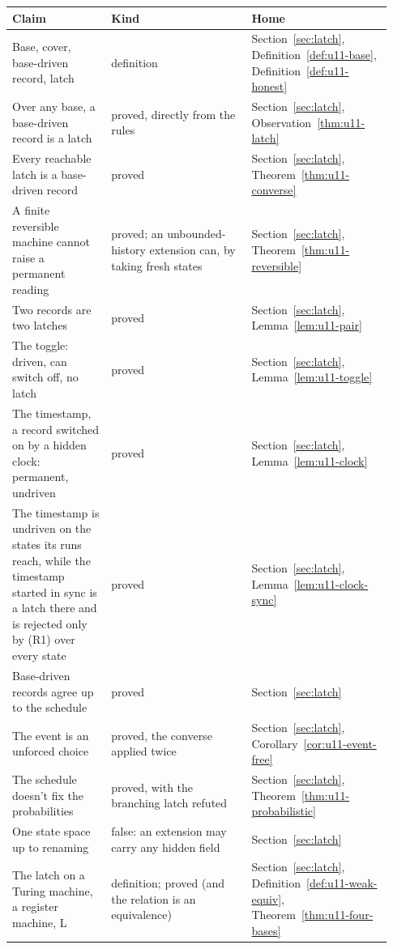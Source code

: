 \documentclass[11pt,twoside]{article}
\theoremstyle{thielethm}
\theoremstyle{thieledef}
\theoremstyle{thieledef}
\theoremstyle{thieledef}
\theoremstyle{thielethm}
\theoremstyle{thieleobs}
\theoremstyle{thielethm}
\begin{document}
\begingroup\small
\begin{longtable}{@{}>{\raggedright\arraybackslash}p{0.242\linewidth}>{\raggedright\arraybackslash}p{0.344\linewidth}>{\raggedright\arraybackslash}p{0.344\linewidth}@{}}
\toprule
\textbf{Claim} & \textbf{Kind} & \textbf{Home} \\
\midrule
\endhead
\bottomrule
\endlastfoot
Base, cover, base-driven record, latch & definition & Section~\ref{sec:latch}, Definition~\ref{def:u11-base}, Definition~\ref{def:u11-honest} \\
Over any base, a base-driven record is a latch & proved, directly from the rules & Section~\ref{sec:latch}, Observation~\ref{thm:u11-latch} \\
Every reachable latch is a base-driven record & proved & Section~\ref{sec:latch}, Theorem~\ref{thm:u11-converse} \\
A finite reversible machine cannot raise a permanent reading & proved; an unbounded-history extension can, by taking fresh states & Section~\ref{sec:latch}, Theorem~\ref{thm:u11-reversible} \\
Two records are two latches & proved & Section~\ref{sec:latch}, Lemma~\ref{lem:u11-pair} \\
The toggle: driven, can switch off, no latch & proved & Section~\ref{sec:latch}, Lemma~\ref{lem:u11-toggle} \\
The timestamp, a record switched on by a hidden clock: permanent, undriven & proved & Section~\ref{sec:latch}, Lemma~\ref{lem:u11-clock} \\
The timestamp is undriven on the states its runs reach, while the timestamp started in sync is a latch there and is rejected only by (R1) over every state & proved & Section~\ref{sec:latch}, Lemma~\ref{lem:u11-clock-sync} \\
Base-driven records agree up to the schedule & proved  & Section~\ref{sec:latch} \\
The event is an unforced choice & proved, the converse applied twice  & Section~\ref{sec:latch}, Corollary~\ref{cor:u11-event-free} \\
The schedule doesn't fix the probabilities & proved, with the branching latch refuted & Section~\ref{sec:latch}, Theorem~\ref{thm:u11-probabilistic} \\
One state space up to renaming & false: an extension may carry any hidden field & Section~\ref{sec:latch} \\
The latch on a Turing machine, a register machine, L & definition; proved (and the relation is an equivalence) & Section~\ref{sec:latch}, Definition~\ref{def:u11-weak-equiv}, Theorem~\ref{thm:u11-four-bases} \\

\end{longtable}
\end{document}
